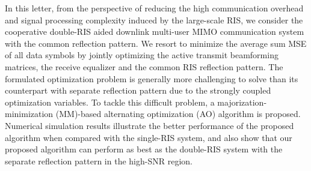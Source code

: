 \documentclass[journal]{IEEEtran}
\begin{document}
In this letter, from  the perspective  of reducing the high  communication overhead and signal processing complexity  induced by the large-scale RIS, we consider the cooperative double-RIS aided downlink multi-user MIMO communication system with the common reflection
pattern.
 We resort to minimize the  average sum MSE of all data symbols by jointly optimizing the active transmit  beamforming matrices, the receive equalizer  and the common RIS reflection pattern. The formulated optimization problem is generally more challenging to solve than its counterpart with separate reflection pattern due to the strongly coupled optimization variables. To tackle this difficult problem,  a
majorization-minimization (MM)-based alternating optimization (AO) algorithm is proposed.
Numerical simulation results  illustrate the better performance of the proposed algorithm when compared with the single-RIS system, and also show that our proposed algorithm can perform as best as the double-RIS system with the separate reflection pattern in the high-SNR region. 
\end{document}
